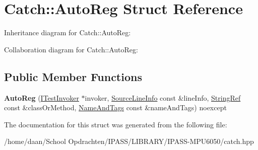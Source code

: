 \hypertarget{structCatch_1_1AutoReg}{}\section{Catch\+:\+:Auto\+Reg Struct Reference}
\label{structCatch_1_1AutoReg}


Inheritance diagram for Catch\+:\+:Auto\+Reg\+:


Collaboration diagram for Catch\+:\+:Auto\+Reg\+:
\subsection*{Public Member Functions}
\begin{DoxyCompactItemize}
\item 
\mbox{\label{structCatch_1_1AutoReg_a7eba02fb9d80b9896bf5a6517369af28}} 
{\bfseries Auto\+Reg} (\hyperlink{structCatch_1_1ITestInvoker}{I\+Test\+Invoker} $\ast$invoker, \hyperlink{structCatch_1_1SourceLineInfo}{Source\+Line\+Info} const \&line\+Info, \hyperlink{classCatch_1_1StringRef}{String\+Ref} const \&class\+Or\+Method, \hyperlink{structCatch_1_1NameAndTags}{Name\+And\+Tags} const \&name\+And\+Tags) noexcept
\end{DoxyCompactItemize}


The documentation for this struct was generated from the following file\+:\begin{DoxyCompactItemize}
\item 
/home/daan/\+School Opdrachten/\+I\+P\+A\+S\+S/\+L\+I\+B\+R\+A\+R\+Y/\+I\+P\+A\+S\+S-\/\+M\+P\+U6050/catch.\+hpp\end{DoxyCompactItemize}
